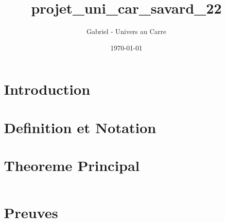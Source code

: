 \documentclass[12pt]{article}
\title{projet_uni_car_savard_22}
\author{Gabriel - Univers au Carre}
\date{\today}
\begin{document}
\maketitle


\section{Introduction}



\section{Definition et Notation}



\section{Theoreme Principal}


\begin{equation}
\end{equation}


\section{Preuves}


\end{document}
